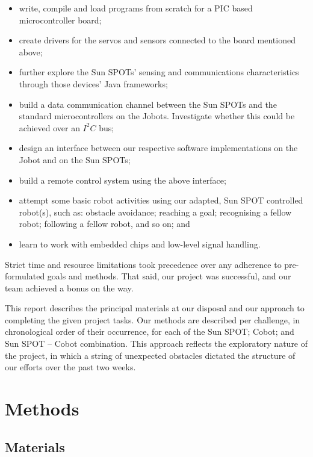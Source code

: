 \documentclass[a4paper,10pt]{article} %
\begin{document}
\begin{itemize}
    \item write, compile and load programs from scratch for a PIC based
    microcontroller board;
    \item create drivers for the servos and sensors connected to the board
    mentioned above;
    \item further explore the Sun SPOTs' sensing and communications
    characteristics through those devices' Java frameworks;
    \item build a data communication channel between the Sun SPOTs and the
    standard microcontrollers on the Jobots. Investigate whether this could be
    achieved over an $I^2C$ bus;
    \item design an interface between our respective software implementations on
    the Jobot and on the Sun SPOTs;
    \item build a remote control system using the above interface;
    \item attempt some basic robot activities using our adapted, Sun SPOT
    controlled robot(s), such as: obstacle avoidance; reaching a goal;
    recognising a fellow robot; following a fellow robot, and so on; and
    \item learn to work with embedded chips and low-level signal handling.
\end{itemize}

Strict time and resource limitations took precedence over any adherence
to pre-formulated goals and methods. That said, our project was successful,
and our team achieved a bonus on the way.

This report describes the principal materials at our disposal and our approach
to completing the given project tasks. Our methods are described per challenge,
in chronological order of their occurrence, for each of the Sun SPOT; Cobot; and
Sun SPOT -- Cobot combination. This approach reflects the exploratory nature of
the project, in which a string of unexpected obstacles dictated the structure of
our efforts over the past two weeks.


\pagebreak

\section{Methods} %

\subsection{Materials} %
\end{document}

